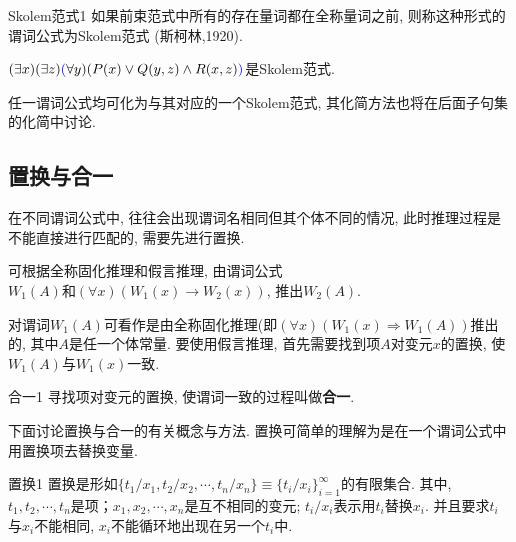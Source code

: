 \begin{mydef}{Skolem范式}{1}
如果前束范式中所有的存在量词都在全称量词之前, 则称这种形式的谓词公式为Skolem范式 (斯柯林,1920).
\end{mydef}

\begin{example}
  $(\exists x) (\exists  z) \textcolor[rgb]{0.00,0.00,1.00}{(}\forall y)(P(x)\vee Q(y,z)\wedge R(x,z)\textcolor[rgb]{0.00,0.00,1.00}{)}$是Skolem范式.
\end{example}

任一谓词公式均可化为与其对应的一个Skolem范式, 其化简方法也将在后面子句集的化简中讨论.
\subsection{置换与合一}
在不同谓词公式中, 往往会出现谓词名相同但其个体不同的情况, 此时推理过程是不能直接进行匹配的, 需要先进行置换.

\begin{example}
可根据全称固化推理和假言推理, 由谓词公式$W_1(A) 和 (\forall x)(W_1(x)\rightarrow W_2(x))$, 推出$W_2(A)$.
\end{example}

\begin{remark}
 对谓词$W_1(A)$可看作是由全称固化推理(即$(\forall x)(W_1(x) \Rightarrow  W_1(A))$推出的, 其中$A$是任一个体常量. 要使用假言推理, 首先需要找到项$A$对变元$x$的置换, 使$W_1(A)$与$W_1(x)$一致.
\end{remark}

\begin{mydef}{合一}{1}
    寻找项对变元的置换, 使谓词一致的过程叫做\textcolor[rgb]{0,0,1}{\textbf{合一}}.
\end{mydef}

下面讨论置换与合一的有关概念与方法. 置换可简单的理解为是在一个谓词公式中用置换项去替换变量.
\begin{mydef}{置换}{1}
置换是形如$\{t_1/x_1,t_2/x_2,\cdots,t_n/x_n\}\equiv \{t_i/x_i\}_{i=1}^{\infty}$的有限集合. 其中, $t_1,t_2,\cdots,t_n$是项；$x_1,x_2,\cdots,x_n$是互不相同的变元;
$t_i/x_i$表示用$t_i$替换$x_i$. 并且要求$t_i$与$x_i$不能相同, $x_i$不能循环地出现在另一个$t_i$中.
\end{mydef}

